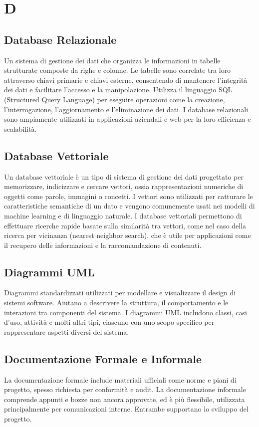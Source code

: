 \documentclass{article}
\begin{document}
\newpage

\section{D}

\subsection{Database Relazionale}
Un sistema di gestione dei dati che organizza le informazioni in tabelle strutturate composte da righe e colonne. Le tabelle sono correlate tra loro attraverso chiavi primarie e chiavi esterne, consentendo di mantenere l'integrità dei dati e facilitare l'accesso e la manipolazione. Utilizza il linguaggio SQL (Structured Query Language) per eseguire operazioni come la creazione, l'interrogazione, l'aggiornamento e l'eliminazione dei dati. I database relazionali sono ampiamente utilizzati in applicazioni aziendali e web per la loro efficienza e scalabilità.

\subsection{Database Vettoriale}
Un database vettoriale è un tipo di sistema di gestione dei dati progettato per memorizzare, indicizzare e cercare vettori, ossia rappresentazioni numeriche di oggetti come parole, immagini o concetti. I vettori sono utilizzati per catturare le caratteristiche semantiche di un dato e vengono comunemente usati nei modelli di machine learning e di linguaggio naturale. I database vettoriali permettono di effettuare ricerche rapide basate sulla similarità tra vettori, come nel caso della ricerca per vicinanza (nearest neighbor search), che è utile per applicazioni come il recupero delle informazioni e la raccomandazione di contenuti.

\subsection{Diagrammi UML}
Diagrammi standardizzati utilizzati per modellare e visualizzare il design di sistemi software. Aiutano a descrivere la struttura, il comportamento e le interazioni tra componenti del sistema. I diagrammi UML includono classi, casi d'uso, attività e molti altri tipi, ciascuno con uno scopo specifico per rappresentare aspetti diversi del sistema. 

\subsection{Documentazione Formale e Informale}
La documentazione formale include materiali ufficiali come norme e piani di progetto, spesso richiesta per conformità e audit. La documentazione informale comprende appunti e bozze non ancora approvate, ed è più flessibile, utilizzata principalmente per comunicazioni interne. Entrambe supportano lo sviluppo del progetto.
\end{document}
